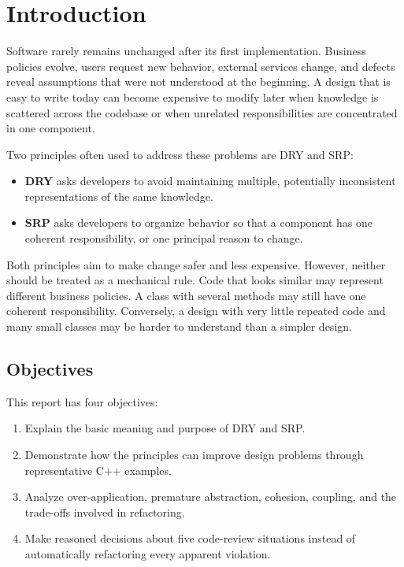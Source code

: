 \documentclass[12pt,a4paper]{article}
\begin{document}
\section{Introduction}

Software rarely remains unchanged after its first implementation. Business policies evolve, users request new behavior, external services change, and defects reveal assumptions that were not understood at the beginning. A design that is easy to write today can become expensive to modify later when knowledge is scattered across the codebase or when unrelated responsibilities are concentrated in one component.

Two principles often used to address these problems are DRY and SRP:

\begin{itemize}

\item \textbf{DRY} asks developers to avoid maintaining multiple, potentially inconsistent representations of the same knowledge.

\item \textbf{SRP} asks developers to organize behavior so that a component has one coherent responsibility, or one principal reason to change.

\end{itemize}

Both principles aim to make change safer and less expensive. However, neither should be treated as a mechanical rule. Code that looks similar may represent different business policies. A class with several methods may still have one coherent responsibility. Conversely, a design with very little repeated code and many small classes may be harder to understand than a simpler design.

\subsection{Objectives}

This report has four objectives:

\begin{enumerate}

\item Explain the basic meaning and purpose of DRY and SRP.

\item Demonstrate how the principles can improve design problems through representative C++ examples.

\item Analyze over-application, premature abstraction, cohesion, coupling, and the trade-offs involved in refactoring.

\item Make reasoned decisions about five code-review situations instead of automatically refactoring every apparent violation.

\end{enumerate}
\end{document}
